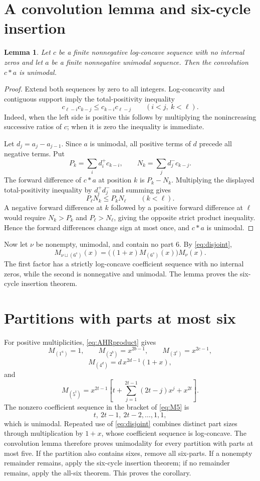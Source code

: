 \documentclass[11pt]{article}
\newtheorem{lemma}{Lemma}
\begin{document}
\section{A convolution lemma and six-cycle insertion}
\begin{lemma}
Let $c$ be a finite nonnegative log-concave sequence with no internal zeros and let $a$ be a finite nonnegative unimodal sequence. Then the convolution $c*a$ is unimodal.
\end{lemma}
\begin{proof}
Extend both sequences by zero to all integers. Log-concavity and contiguous support imply the total-positivity inequality
\[
c_{\ell-i}c_{k-j}\le c_{k-i}c_{\ell-j}\qquad(i<j,\ k<\ell).
\]
Indeed, when the left side is positive this follows by multiplying the nonincreasing successive ratios of $c$; when it is zero the inequality is immediate.

Let $d_j=a_j-a_{j-1}$. Since $a$ is unimodal, all positive terms of $d$ precede all negative terms. Put
\[
P_k=\sum_i d_i^+c_{k-i},\qquad N_k=\sum_j d_j^-c_{k-j}.
\]
The forward difference of $c*a$ at position $k$ is $P_k-N_k$. Multiplying the displayed total-positivity inequality by $d_i^+d_j^-$ and summing gives
\[
P_\ell N_k\le P_kN_\ell\qquad(k<\ell).
\]
A negative forward difference at $k$ followed by a positive forward difference at $\ell$ would require $N_k>P_k$ and $P_\ell>N_\ell$, giving the opposite strict product inequality. Hence the forward differences change sign at most once, and $c*a$ is unimodal.
\end{proof}

Now let $\nu$ be nonempty, unimodal, and contain no part $6$. By \eqref{eq:disjoint},
\[
M_{\nu\sqcup(6^s)}(x)=\bigl((1+x)M_{(6^s)}(x)\bigr)M_\nu(x).
\]
The first factor has a strictly log-concave coefficient sequence with no internal zeros, while the second is nonnegative and unimodal. The lemma proves the six-cycle insertion theorem.

\section{Partitions with parts at most six}
For positive multiplicities, \eqref{eq:AHRproduct} gives
\[
M_{(1^a)}=1,\qquad M_{(2^b)}=x^{2b-1},\qquad M_{(3^c)}=x^{2c-1},
\]
\[
M_{(4^d)}=d\,x^{2d-1}(1+x),
\]
and
\begin{equation}
M_{(5^t)}=x^{2t-1}\left[t+\sum_{j=1}^{2t-1}(2t-j)x^j+x^{2t}\right].
\label{eq:M5}
\end{equation}
The nonzero coefficient sequence in the bracket of \eqref{eq:M5} is
\[
t,\ 2t-1,\ 2t-2,\ldots,1,1,
\]
which is unimodal. Repeated use of \eqref{eq:disjoint} combines distinct part sizes through multiplication by $1+x$, whose coefficient sequence is log-concave. The convolution lemma therefore proves unimodality for every partition with parts at most five. If the partition also contains sixes, remove all six-parts. If a nonempty remainder remains, apply the six-cycle insertion theorem; if no remainder remains, apply the all-six theorem. This proves the corollary.
\end{document}
